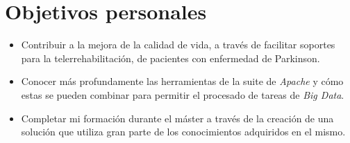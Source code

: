 \section{Objetivos personales}

\begin{itemize}
	\item Contribuir a la mejora de la calidad de vida, a través de facilitar soportes para la telerrehabilitación, de pacientes con enfermedad de Parkinson.
	\item Conocer más profundamente las herramientas de la suite de \textit{Apache} y cómo estas se pueden combinar para permitir el procesado de tareas de \textit{Big Data}.
	\item Completar mi formación durante el máster a través de la creación de una solución que utiliza gran parte de los conocimientos adquiridos en el mismo.
\end{itemize}

